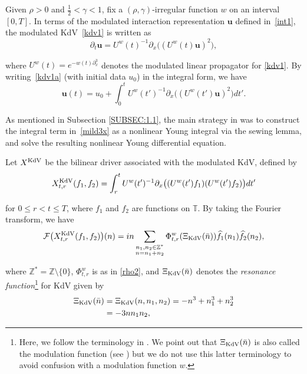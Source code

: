 \documentclass[letterpaper, 11pt,  reqno]{amsart}
\newcommand{\1}{\hspace{0.5mm}\text{I}\hspace{0.5mm}}
\newcommand{\noi}{\noindent}
\newcommand{\Z}{\mathbb{Z}}
\newcommand{\T}{\mathbb{T}}
\newcommand{\F}{\mathcal{F}}
\newcommand{\g}{\gamma}
\newcommand{\ft}{\widehat}
\newcommand{\dx}{\partial_x}
\newcommand{\dt}{\partial_t}
\newcommand{\uw}{U^w}
\newcommand{\uu}{\mathbf{u}}
\newcommand{\KDV}{\text{\rm KdV} }
\numberwithin{equation}{section}
\numberwithin{theorem}{section}
\begin{document}
Given  $\rho > 0 $ and  $\frac 12  < \g < 1$, 
fix a 
 $(\rho,\g)$-irregular function $w$ on an interval $[0, T]$.
In terms of 
the modulated interaction representation $\uu$
defined in~\eqref{int1}, 
the modulated KdV~\eqref{kdv1}
is written as 
\begin{equation}
\dt \uu = \uw(t)^{-1} \dx\big( (\uw(t) \uu)^2\big), 
\label{kdv1a}
\end{equation}

\noi
where 
$\uw (t)=e^{-   w(t)\dx^3}  $
denotes the modulated linear propagator for \eqref{kdv1}.
By writing~\eqref{kdv1a} (with initial data $u_0$) in the integral form, we have
\begin{equation}
\uu(t) = u_0 + \int_0 ^t \uw(t')^{-1}
\dx\big( (\uw(t') \uu)^2\big)dt'.
\label{mild3x}
\end{equation}

\noi
As mentioned in Subsection \ref{SUBSEC:1.1}, the main strategy
in \cite{CGLLO1}
was to construct the integral term 
in~\eqref{mild3x}
as a nonlinear Young integral via the sewing lemma, 
and solve the resulting nonlinear Young differential equation.



Let $X^\KDV$ be 
the 
bilinear driver  associated with the modulated KdV, 
defined by 
 \begin{align}
X^\KDV_{t,r}(f_1,f_2)
=\int_r^t  \uw(t')^{-1}  \partial_x
\big( (\uw(t')  f_1)( \uw(t') f_2 )\big) dt'
\label{K1}
\end{align}


\noi
for $0 \le r < t \le T$, 
where $f_1$ and $f_2$ are  functions  on $\T$.
By taking the Fourier transform, we have
\begin{align}
\F\big(X^\KDV_{t,r} (f_1,f_2)\big) (n)
= in \sum_{ \substack{n_1, n_2 \in \Z^*\\n = n_1+n_2}}
 \Phi^w_{t,r}(\Xi_\KDV (\bar n))
\ft f_1(n_1)  \ft f_2(n_2),
\label{K2}
\end{align}


\noi
where $\Z^* = \Z \setminus \{0\}$, $\Phi^w_{t,r}$ is as in \eqref{rho2}, 
and $\Xi_\KDV (\bar n)$ denotes the {\it resonance function}\footnote{Here, we follow
the terminology in \cite{Tao2}.  
We point out that $\Xi_\KDV (\bar n)$ is also called the modulation function (see \cite{KOY})
but we do not use this latter terminology to avoid
confusion with a modulation function $w$.
}
 for KdV given by 
\begin{align}
\begin{split}
\Xi_\KDV (\bar n) &  = \Xi_\KDV (n,n_1,n_2) 
= - n^3+ n_1^3 +n_2^3\\
&  = - 3n n_1 n_2, 
\end{split}
\label{K3a}
\end{align}
\end{document}
